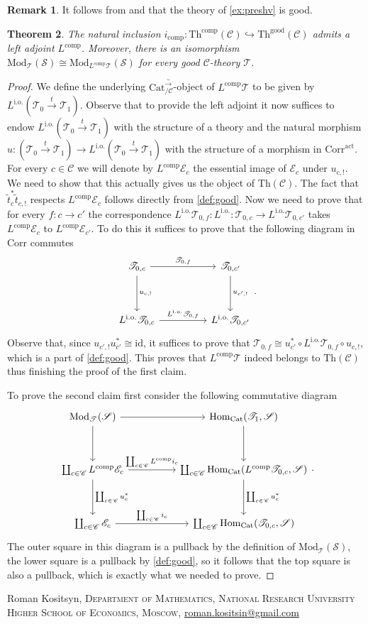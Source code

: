 \documentclass[a4paper, reqno]{amsart}
\newtheorem{theorem}{Theorem}[section]
\theoremstyle{definition}
\newtheorem{remark}[theorem]{Remark}
\newcommand\cC{\mathscr C}
\newcommand\cE{\mathscr E}
\newcommand\cS{\mathscr S}
\newcommand\cT{\mathscr T}
\newcommand\good{\mathrm{good}}
\newcommand\id{\mathrm{id}}
\newcommand\mor{\mathrm{Hom}}
\newcommand\cat{\mathrm{Cat}}
\newcommand\comp{\mathrm{comp}}
\newcommand\thr{\mathrm{Th}}
\newcommand\corr{\mathrm{Corr}}
\newcommand\modl{\mathrm{Mod}}
\newcommand\bo{\mathrm{i.o.}}
\newcommand\wrr{{\overset{\sim}{\rightarrow}}}
\newcommand\act{\mathrm{act}}
\begin{document}
\begin{remark}
It follows from \cite[Corollary 13.4.]{chu2019homotopy} and \cite[Corollary 13.8.]{chu2019homotopy} that the theory of \cref{ex:preshv} is good.
\end{remark}
\begin{theorem}\label{thm:comp}
The natural inclusion $i_\comp:\thr^\comp(\cC)\hookrightarrow\thr^\good(\cC)$ admits a left adjoint $L^\comp$. Moreover, there is an isomorphism $\modl_\cT(\cS)\cong\modl_{L^\comp\cT}(\cS)$ for every good $\cC$-theory $\cT$.
\end{theorem}
\begin{proof}
We define the underlying $\cat^\wrr_{/\cC}$-object of $L^\comp\cT$ to be given by $L^\bo(\cT_0\xrightarrow{t}\cT_1)$. Observe that to provide the left adjoint it now suffices to endow $L^\bo(\cT_0\xrightarrow{t}\cT_1)$ with the structure of a theory and the natural morphism $u:(\cT_0\xrightarrow{t}\cT_1)\rightarrow L^\bo(\cT_0\xrightarrow{t}\cT_1)$ with the structure of a morphism in $\corr^\act$. For every $c\in\cC$ we will denote by $L^\comp\cE_c$ the essential image of $\cE_c$ under $u_{c,!}$. We need to show that this actually gives us the object of $\thr(\cC)$. The fact that $\widetilde{t}^*_c\widetilde{t}_{c,!}$ respects $L^\comp\cE_c$ follows directly from \cref{def:good}. Now we need to prove that for every $f:c\rightarrow c'$ the correspondence $L^\bo\cT_{0,f}:L^\bo:\cT_{0,c}\rightarrow L^\bo\cT_{0,c'}$ takes $L^\comp\cE_c$ to $L^\comp\cE_{c'}$. To do this it suffices to prove that the following diagram in $\corr$ commutes
\[
\begin{tikzcd}[row sep=huge, column sep=huge]
\cT_{0,c}\arrow[r, "\cT_{0,f}"]\arrow[d, "u_{c,!}"]&\cT_{0,c'}\arrow[d, "u_{c',!}"]\\
L^\bo\cT_{0,c}\arrow[r, "L^\bo\cT_{0,f}"]&L^\bo\cT_{0,c'}
\end{tikzcd}.
\]
Observe that, since $u_{c',!}u^*_{c'}\cong\id$, it suffices to prove that $\cT_{0,f}\cong u^*_{c'}\circ L^\bo\cT_{0,f}\circ u_{c,!}$, which is a part of \cref{def:good}. This proves that $L^\comp\cT$ indeed belongs to $\thr(\cC)$ thus finishing the proof of the first claim.\par
To prove the second claim first consider the following commutative diagram
\[
\begin{tikzcd}[row sep=huge, column sep=huge]
\modl_\cT(\cS)\arrow[r]\arrow[d]&\mor_\cat(\cT_1,\cS)\arrow[d]\\
\coprod_{c\in\cC}L^\comp\cE_c\arrow[r, "\coprod_{c\in\cC} L^\comp i_c"]\arrow[d, "\coprod_{c\in\cC} u^*_c"]&\coprod_{c\in\cC}\mor_\cat(L^\comp\cT_{0,c},\cS)\arrow[d, "\coprod_{c\in\cC}u^*_c"]\\
\coprod_{c\in\cC}\cE_c\arrow[r, "\coprod_{c\in\cC} i_c"]&\coprod_{c\in\cC}\mor_\cat(\cT_{0,c},\cS)
\end{tikzcd}.
\]
The outer square in this diagram is a pullback by the definition of $\modl_\cT(\cS)$, the lower square is a pullback by \cref{def:good}, so it follows that the top square is also a pullback, which is exactly what we needed to prove.
\end{proof}
\medskip


\bigskip
Roman Kositsyn, \textsc{ Department of Mathematics, National Research University Higher School of Economics, Moscow}, \href{mailto:roman.kositsin@gmail.com}{roman.kositsin@gmail.com}
\end{document}
